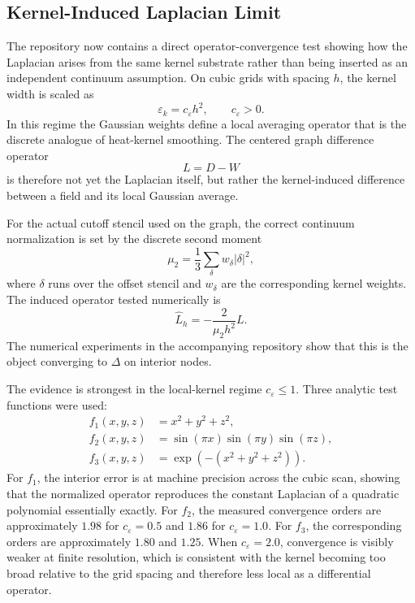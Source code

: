 \documentclass[11pt]{article}
\begin{document}
\subsection{Kernel-Induced Laplacian Limit}
The repository now contains a direct operator-convergence test showing how the Laplacian arises from the same kernel substrate rather than being inserted as an independent continuum assumption. On cubic grids with spacing $h$, the kernel width is scaled as
\begin{equation}
\varepsilon_k = c_\varepsilon h^2,
\qquad
c_\varepsilon > 0.
\end{equation}
In this regime the Gaussian weights define a local averaging operator that is the discrete analogue of heat-kernel smoothing. The centered graph difference operator
\begin{equation}
L = D - W
\end{equation}
is therefore not yet the Laplacian itself, but rather the kernel-induced difference between a field and its local Gaussian average.

For the actual cutoff stencil used on the graph, the correct continuum normalization is set by the discrete second moment
\begin{equation}
\mu_2 = \frac{1}{3}\sum_{\delta} w_\delta |\delta|^2,
\end{equation}
where $\delta$ runs over the offset stencil and $w_\delta$ are the corresponding kernel weights. The induced operator tested numerically is
\begin{equation}
\widehat{L}_h = -\frac{2}{\mu_2 h^2} L.
\end{equation}
The numerical experiments in the accompanying repository show that this is the object converging to $\Delta$ on interior nodes.

The evidence is strongest in the local-kernel regime $c_\varepsilon \le 1$. Three analytic test functions were used:
\begin{align}
f_1(x,y,z) &= x^2 + y^2 + z^2, \\
f_2(x,y,z) &= \sin(\pi x)\sin(\pi y)\sin(\pi z), \\
f_3(x,y,z) &= \exp(-(x^2+y^2+z^2)).
\end{align}
For $f_1$, the interior error is at machine precision across the cubic scan, showing that the normalized operator reproduces the constant Laplacian of a quadratic polynomial essentially exactly. For $f_2$, the measured convergence orders are approximately $1.98$ for $c_\varepsilon=0.5$ and $1.86$ for $c_\varepsilon=1.0$. For $f_3$, the corresponding orders are approximately $1.80$ and $1.25$. When $c_\varepsilon=2.0$, convergence is visibly weaker at finite resolution, which is consistent with the kernel becoming too broad relative to the grid spacing and therefore less local as a differential operator.
\end{document}

